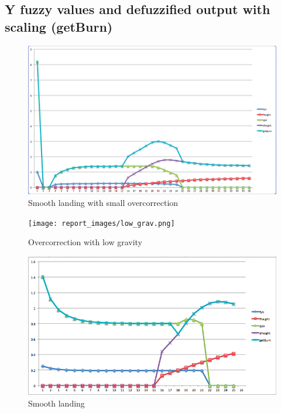 \documentclass[12pt]{article}
\begin{document}
\subsection{Y fuzzy values and defuzzified output with scaling (getBurn)}

\begin{figure}[h!]
        \begin{center}
                \includegraphics[width=130mm]{report_images/smooth.png}
                \caption{Smooth landing with small overcorrection}
                \label{smooth}
        \end{center}
\end{figure}

\begin{figure}[h!]
        \begin{center}
                \texttt{[image: report\_images/low\_grav.png]}
                \caption{Overcorrection with low gravity}
                \label{smooth}
        \end{center}
\end{figure}

\begin{figure}[h!]
        \begin{center}
                \includegraphics[width=130mm]{report_images/smooth2.png}
                \caption{Smooth landing}
                \label{smooth2}
        \end{center}
\end{figure}
\end{document}
